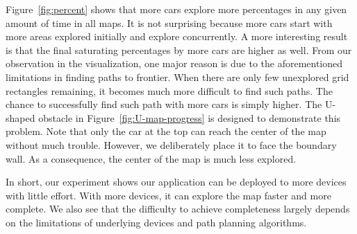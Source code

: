 Figure~\ref{fig:percent} shows that more cars explore more percentages in any given amount of time in all maps.
It is not surprising because more cars start with more areas explored initially and explore concurrently.
A more interesting result is that the final saturating percentages by more cars are higher as well.
From our observation in the visualization, one major reason is due to the aforementioned limitations in finding paths to frontier.
When there are only few unexplored grid rectangles remaining,
it becomes much more difficult to find such paths.
The chance to successfully find such path with more cars is simply higher.
The U-shaped obstacle in Figure~\ref{fig:U-map-progress} is designed to demonstrate this problem.
Note that only the car at the top can reach the center of the map without much trouble.
However, we deliberately place it to face the boundary wall.
As a consequence, the center of the map is much less explored.

In short, our experiment shows our \dmap application can be deployed to more devices with little effort.
With more devices, it can explore the map faster and more complete.
We also see that the difficulty to achieve completeness largely depends on the limitations of underlying devices and path planning algorithms.
